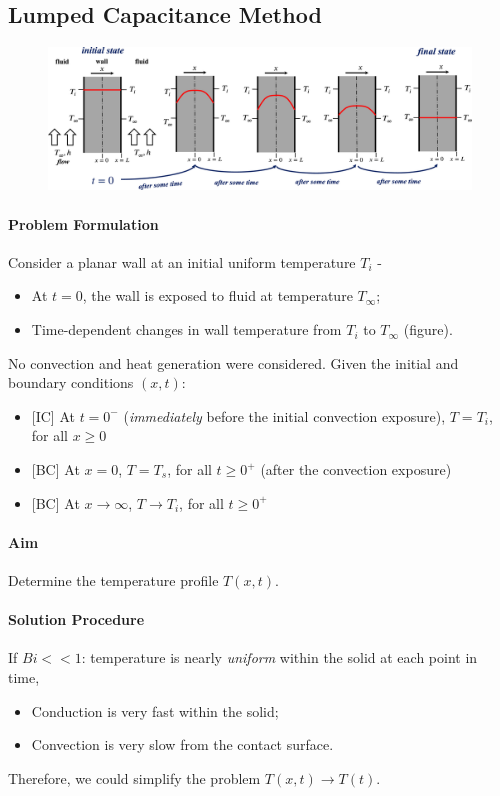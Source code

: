 \documentclass[12pt, a4paper]{article}
\begin{document}
\subsection{Lumped Capacitance Method}
\begin{figure}[H]
    \centering
    \includegraphics[width=\textwidth]{img/temporal_propagation.eps}
\end{figure}

\paragraph{Problem Formulation} Consider a planar wall at an initial uniform temperature $T_i$ -
\begin{itemize}
    \item At $t = 0$, the wall is exposed to fluid at temperature $T_\infty$;
    \item Time-dependent changes in wall temperature from $T_i$ to $T_\infty$ (figure).
\end{itemize}
No convection and heat generation were considered. 
Given the initial and boundary conditions $(x, t)$:
\begin{itemize}
    \item {\color{gray}[IC]} At $t=0^-$ (\textit{immediately} before the initial convection exposure), $T = T_i$, for all $x \geq 0$
    \item {\color{gray}[BC]} At $x=0$, $T = T_s$, for all $t \geq 0^+$ (after the convection exposure)
    \item {\color{gray}[BC]} At $x \to \infty$, $T \to T_i$, for all $t \geq 0^+$
\end{itemize}

\paragraph{Aim} Determine the temperature profile $T(x, t)$.

\paragraph{Solution Procedure}
If $Bi << 1$: temperature is nearly \textit{uniform} within the solid at each point in time,
\begin{itemize}
    \item Conduction is very fast within the solid;
    \item Convection is very slow from the contact surface.
\end{itemize}
Therefore, we could simplify the problem $T(x, t) \to T(t)$.\\
\end{document}

